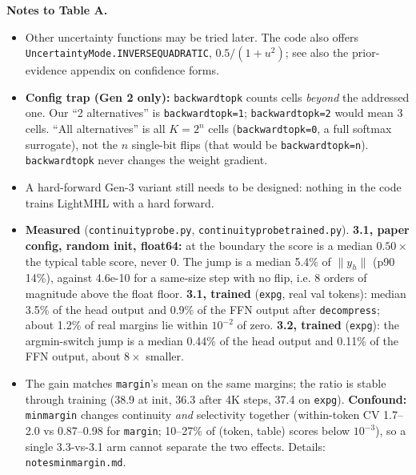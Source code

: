 \documentclass[10pt]{article}
\newcommand{\code}[1]{{\renewcommand{\_}{\textunderscore\allowbreak}\texttt{#1}}}
\newcommand{\note}[1]{\textsuperscript{\textbf{#1}}}
\begin{document}
\normalsize
\noindent\textbf{Notes to Table A.}
\begin{itemize}\setlength\itemsep{0pt}\footnotesize
\item[\note{a}] Other uncertainty functions may be tried later. The code also offers \code{UncertaintyMode.INVERSE\_QUADRATIC}, $0.5/(1+u^2)$; see also the prior-evidence appendix on confidence forms.
\item[\note{b}] \textbf{Config trap (Gen 2 only):} \code{backward\_topk} counts cells \emph{beyond} the addressed one. Our ``2 alternatives'' is
  \code{backward\_topk=1}; \code{backward\_topk=2} would mean 3 cells. ``All alternatives'' is all $K=2^n$ cells (\code{backward\_topk=0}, a full softmax surrogate),
  not the $n$ single-bit flips (that would be \code{backward\_topk=n}). \code{backward\_topk} never changes the weight gradient.
\item[\note{c}] A hard-forward Gen-3 variant still needs to be designed: nothing in the code trains LightMHL with a hard forward.
\item[\note{d}] \textbf{Measured} (\code{continuity\_probe.py}, \code{continuity\_probe\_trained.py}).
  \textbf{3.1, paper config, random init, float64:} at the boundary the score is a median $0.50\times$ the typical table score, never 0.
  The jump is a median 5.4\% of $\|y_h\|$ (p90 14\%), against 4.6e-10 for a same-size step with no flip, i.e. 8 orders of magnitude above the float floor.
  \textbf{3.1, trained} (\code{exp\_g\_0193}, real val tokens): median 3.5\% of the head output and 0.9\% of the FFN output after \code{decompress};
  about 1.2\% of real margins lie within $10^{-2}$ of zero. \textbf{3.2, trained} (\code{exp\_g\_0194}): the argmin-switch jump is a median 0.44\% of the head output
  and 0.11\% of the FFN output, about $8\times$ smaller.
\item[\note{e}] The gain matches \code{margin}'s mean on the same margins; the ratio is stable through training (38.9 at init, 36.3 after 4K steps,
  37.4 on \code{exp\_g\_0193}). \textbf{Confound:} \code{min\_margin} changes continuity \emph{and} selectivity together (within-token CV 1.7--2.0 vs 0.87--0.98 for
  \code{margin}; 10--27\% of (token, table) scores below $10^{-3}$), so a single 3.3-vs-3.1 arm cannot separate the two effects. Details: \code{notes\_min\_margin.md}.
\end{itemize}

\newpage
\end{document}
